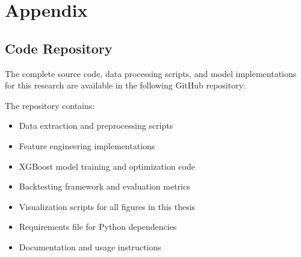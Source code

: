 \chapter{Appendix}

\section{Code Repository}

The complete source code, data processing scripts, and model implementations for this research are available in the following GitHub repository:

\vspace{1em}
\begin{center}
\end{center}
\vspace{1em}

The repository contains:
\begin{itemize}
    \item Data extraction and preprocessing scripts
    \item Feature engineering implementations
    \item XGBoost model training and optimization code
    \item Backtesting framework and evaluation metrics
    \item Visualization scripts for all figures in this thesis
    \item Requirements file for Python dependencies
    \item Documentation and usage instructions
\end{itemize}


